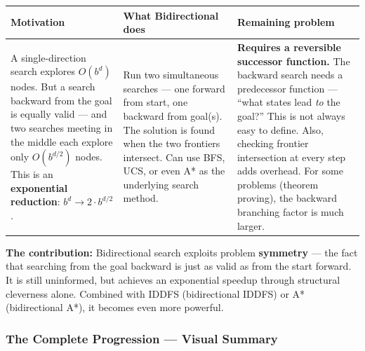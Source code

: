 \documentclass[12pt, a4paper]{article}
\begin{document}
\begin{center}
\renewcommand{\arraystretch}{1.2}
\begin{tabular}{p{3.5cm}|p{6cm}|p{6cm}}
\toprule
\textbf{Motivation} & \textbf{What Bidirectional does} & \textbf{Remaining problem} \\
\midrule
A single-direction search explores $O(b^d)$ nodes. But a search backward from the goal is equally valid — and two searches meeting in the middle each explore only $O(b^{d/2})$ nodes. This is an \textbf{exponential reduction}: $b^d \to 2 \cdot b^{d/2}$. &
Run two simultaneous searches — one forward from start, one backward from goal(s). The solution is found when the two frontiers intersect. Can use BFS, UCS, or even A* as the underlying search method. &
\textbf{Requires a reversible successor function.} The backward search needs a predecessor function — ``what states lead \emph{to} the goal?'' This is not always easy to define. Also, checking frontier intersection at every step adds overhead. For some problems (theorem proving), the backward branching factor is much larger. \\
\bottomrule
\end{tabular}
\end{center}

\noindent\textbf{The contribution:} Bidirectional search exploits problem \textbf{symmetry} — the fact that searching from the goal backward is just as valid as from the start forward. It is still uninformed, but achieves an exponential speedup through structural cleverness alone. Combined with IDDFS (bidirectional IDDFS) or A* (bidirectional A*), it becomes even more powerful.

\subsubsection*{The Complete Progression — Visual Summary}
\end{document}
